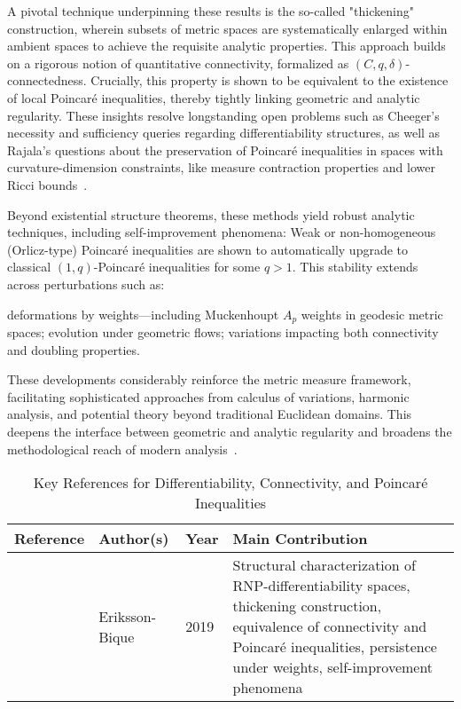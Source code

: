 \documentclass[sigconf]{acmart}
\begin{document}
A pivotal technique underpinning these results is the so-called "thickening" construction, wherein subsets of metric spaces are systematically enlarged within ambient spaces to achieve the requisite analytic properties. This approach builds on a rigorous notion of quantitative connectivity, formalized as $(C, q, \delta)$-connectedness. Crucially, this property is shown to be equivalent to the existence of local Poincaré inequalities, thereby tightly linking geometric and analytic regularity. These insights resolve longstanding open problems such as Cheeger's necessity and sufficiency queries regarding differentiability structures, as well as Rajala's questions about the preservation of Poincaré inequalities in spaces with curvature-dimension constraints, like measure contraction properties and lower Ricci bounds~\cite{ref93}.

Beyond existential structure theorems, these methods yield robust analytic techniques, including self-improvement phenomena: Weak or non-homogeneous (Orlicz-type) Poincaré inequalities are shown to automatically upgrade to classical $(1, q)$-Poincaré inequalities for some $q > 1$. This stability extends across perturbations such as:

deformations by weights—including Muckenhoupt $A_p$ weights in geodesic metric spaces;
evolution under geometric flows;
variations impacting both connectivity and doubling properties.

These developments considerably reinforce the metric measure framework, facilitating sophisticated approaches from calculus of variations, harmonic analysis, and potential theory beyond traditional Euclidean domains. This deepens the interface between geometric and analytic regularity and broadens the methodological reach of modern analysis~\cite{ref93}.

\begin{table*}[htbp]
\centering
\caption{Key References for Differentiability, Connectivity, and Poincaré Inequalities}
\label{tab:keyrefs-diff-poincare}
\begin{adjustbox}{max width=\textwidth}
\begin{tabular}{@{}llll@{}}
\toprule
Reference & Author(s) & Year & Main Contribution \\
\midrule
\cite{ref93} & Eriksson-Bique & 2019 & Structural characterization of RNP-differentiability spaces, thickening construction, equivalence of connectivity and Poincaré inequalities, persistence under weights, self-improvement phenomena \\
\bottomrule
\end{tabular}
\end{adjustbox}
\end{table*}
\end{document}
